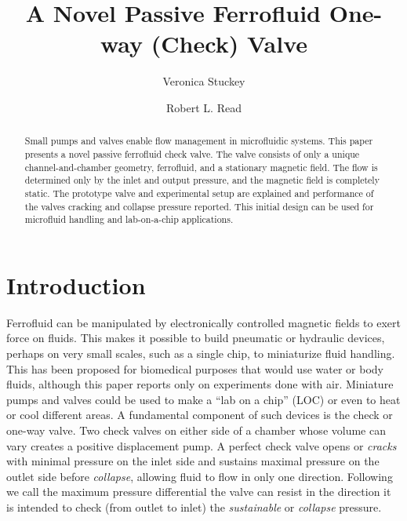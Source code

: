 \documentclass[twocolumn,10pt]{asme2ej}
\title{A Novel Passive Ferrofluid One-way (Check) Valve}
\author{Veronica Stuckey
  \affiliation{
    Biomedical Engineer, University of Texas at Austin \\
    Email:  stuckey002@gmail.com
    }
}
\author{Robert L. Read
\affiliation{
  Founder, Public Invention\\
  Email: read.robert@gmail.com
    }
}
\begin{document}
\maketitle

\begin{abstract}

Small pumps and valves enable flow management in microfluidic systems.
This paper presents a novel passive ferrofluid check valve.
The valve consists of only a
unique channel-and-chamber geometry, ferrofluid, and a stationary
magnetic field.
The flow is determined only by the inlet and output pressure,
and the magnetic field is completely static.
The prototype valve and experimental setup are explained
and performance of the valves cracking and collapse pressure reported.
This initial design can be used for microfluid handling and lab-on-a-chip
applications.
\end{abstract}

\section{Introduction}

Ferrofluid can be manipulated by electronically controlled magnetic
fields to exert force on fluids\cite{torres2014recent,kole2021engineering,ozbey2015modeling}.
This makes it possible to build pneumatic or hydraulic
devices, perhaps on very small scales,
such as a single chip\cite{yamahata2003ferrofluid,hatch2001ferrofluidic}, to
miniaturize fluid handling.
This has been proposed for biomedical purposes\cite{michelson2019novel}
that would use water or body fluids,
although this paper reports only on experiments done with air.
Miniature pumps and valves could be used to make a “lab on a chip” (LOC) or
even to heat or cool different areas.
A fundamental component of such
devices is the check or one-way valve.
Two check
valves on either side of a chamber whose volume can vary creates a
positive displacement pump.
A perfect check valve opens or
{\em cracks} with minimal pressure on the inlet side and sustains maximal
pressure on the outlet side before {\em collapse},
allowing fluid to flow in only one
direction. Following\cite{hartshorne2004ferrofluid} we call the maximum pressure
differential the valve can resist in the direction it is intended to
check (from outlet to inlet) the {\em sustainable} or {\em collapse} pressure.
\end{document}
